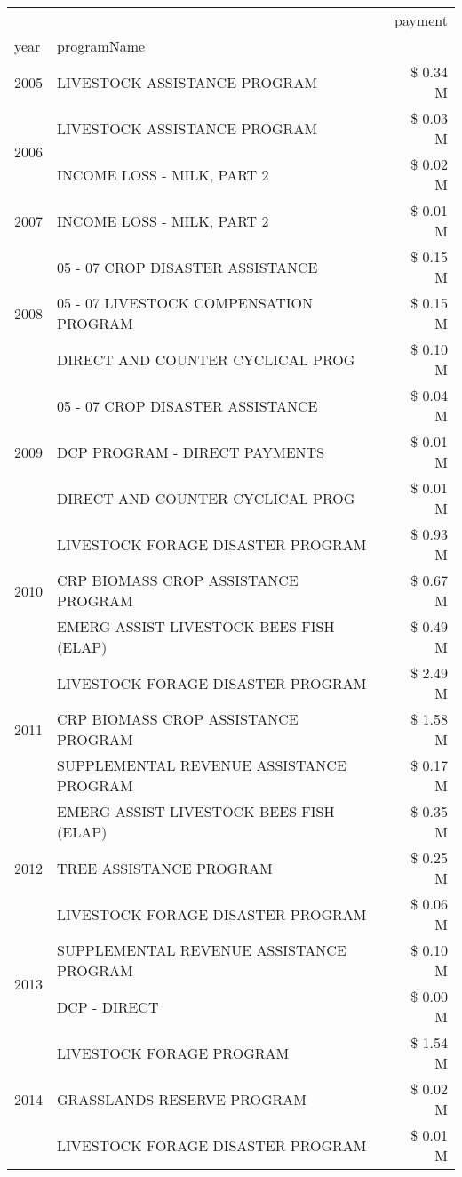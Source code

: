 \begin{tabular}{llr}
\toprule
 &  & payment \\
year & programName &  \\
\midrule
2005 & LIVESTOCK ASSISTANCE PROGRAM & \$ 0.34 M \\
\cline{1-3}
\multirow[t]{2}{*}{2006} & LIVESTOCK ASSISTANCE PROGRAM & \$ 0.03 M \\
 & INCOME LOSS - MILK, PART 2 & \$ 0.02 M \\
\cline{1-3}
2007 & INCOME LOSS - MILK, PART 2 & \$ 0.01 M \\
\cline{1-3}
\multirow[t]{3}{*}{2008} & 05 - 07 CROP DISASTER ASSISTANCE & \$ 0.15 M \\
 & 05 - 07 LIVESTOCK COMPENSATION PROGRAM & \$ 0.15 M \\
 & DIRECT AND COUNTER CYCLICAL PROG & \$ 0.10 M \\
\cline{1-3}
\multirow[t]{3}{*}{2009} & 05 - 07 CROP DISASTER ASSISTANCE & \$ 0.04 M \\
 & DCP PROGRAM - DIRECT PAYMENTS & \$ 0.01 M \\
 & DIRECT AND COUNTER CYCLICAL PROG & \$ 0.01 M \\
\cline{1-3}
\multirow[t]{3}{*}{2010} & LIVESTOCK FORAGE DISASTER PROGRAM & \$ 0.93 M \\
 & CRP BIOMASS CROP ASSISTANCE PROGRAM & \$ 0.67 M \\
 & EMERG ASSIST LIVESTOCK BEES FISH (ELAP) & \$ 0.49 M \\
\cline{1-3}
\multirow[t]{3}{*}{2011} & LIVESTOCK FORAGE DISASTER PROGRAM & \$ 2.49 M \\
 & CRP BIOMASS CROP ASSISTANCE PROGRAM & \$ 1.58 M \\
 & SUPPLEMENTAL REVENUE ASSISTANCE PROGRAM & \$ 0.17 M \\
\cline{1-3}
\multirow[t]{3}{*}{2012} & EMERG ASSIST LIVESTOCK BEES FISH (ELAP) & \$ 0.35 M \\
 & TREE ASSISTANCE PROGRAM & \$ 0.25 M \\
 & LIVESTOCK FORAGE DISASTER PROGRAM & \$ 0.06 M \\
\cline{1-3}
\multirow[t]{2}{*}{2013} & SUPPLEMENTAL REVENUE ASSISTANCE PROGRAM & \$ 0.10 M \\
 & DCP - DIRECT & \$ 0.00 M \\
\cline{1-3}
\multirow[t]{3}{*}{2014} & LIVESTOCK FORAGE PROGRAM & \$ 1.54 M \\
 & GRASSLANDS RESERVE PROGRAM & \$ 0.02 M \\
 & LIVESTOCK FORAGE DISASTER PROGRAM & \$ 0.01 M \\

\end{tabular}
